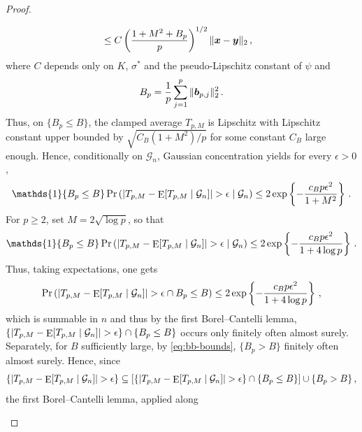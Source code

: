 \documentclass{article}
\makeatletter
\DeclareMathOperator{\expect}{E}
\theoremstyle{definition}
\newcommand{\vnorm}[1]{%
	\ensuremath{%
		\if@display
		\left\| #1 \right\|
		\else
		\| #1 \|
		\fi
	}%
}
\newcommand{\abs}[1]{%
	\ensuremath{%
		\if@display
		\left| #1 \right|
		\else
		\lvert #1 \rvert
		\fi
	}%
}
\newcommand*{\bb}{\boldsymbol}
\makeatother
\begin{document}
\begin{bibunit}
\begin{proof}
\begin{enumerate}[label=(\roman{*})]
$$\begin{aligned}
    &\leq
    C
    \left(
        \frac{1+M^2+B_p}{p}
    \right)^{1/2}
    \vnorm{\bb x-\bb y}_2\,,
\end{aligned}
$$
where $C$ depends only on $K$, $\sigma^*$ and the pseudo-Lipschitz constant of
$\psi$ and 
$$
    B_p 
    = \frac{1}{p} \sum_{j=1}^{p} \vnorm{\bb b_{p,j}}_2^2 \,.
$$
Thus, on $\{B_p\leq B\}$, the clamped average $T_{p,M}$ is Lipschitz with Lipschitz constant upper bounded by $\sqrt{C_B(1 + M^2) / p}$ for some constant $C_B$ large enough. 
Hence, conditionally on $\mathcal G_n$, Gaussian concentration
\citep[Theorem~5.2.2]{vershynin:2018} yields for every
$\epsilon>0$,
\begin{equation}
    \label{eq:prob-bound-lips} 
        \mathds{1}\{B_p\leq B\}
    \Pr
    \left(
        \abs{
            T_{p,M}
            -
            \expect[T_{p,M}\mid\mathcal G_n]
        }
        >
        \epsilon
        \mid
        \mathcal G_n
    \right)
    \leq
    2
    \exp
    \left\{
        -
        \frac{c_Bp\epsilon^2}{1+M^2}
    \right\}\,.
\end{equation}
For $p \geq 2$, set
$
    M =
    2\sqrt{\log p}
$, 
so that
\begin{equation}
    \label{eq:lips-bound} 
   \begin{aligned}
     \mathds{1}\{B_p \leq B \} \Pr \left( \abs{
            T_{p,M}
            -
            \expect[T_{p,M}\mid\mathcal G_n]
        }
        >
        \epsilon
        \mid
        \mathcal G_n\right) 
        \leq 2
    \exp
    \left\{
        -
        \frac{
            c_Bp\epsilon^2
        }{
            1+4\log p
        }
    \right\} \,. 
   \end{aligned}
\end{equation}
Thus, taking expectations, one gets 
$$
    \Pr \left( \abs{T_{p,M} - \expect[T_{p,M} \mid \mathcal G_n]} > \epsilon \cap B_p \leq B \right) \leq  2
    \exp
    \left\{
        -
        \frac{
            c_Bp\epsilon^2
        }{
            1+4\log p
        }
    \right\} \,, 
$$
which is summable in $n$ and thus by the first Borel--Cantelli lemma, $\{\abs{T_{p,M} - \expect[T_{p,M} \mid \mathcal G_n]} > \epsilon \} \cap \{ B_p \leq B\}$ occurs only finitely often almost surely. 
Separately, for $B$ sufficiently large, by \eqref{eq:bb-bounds}, $\{ B_p > B \}$ finitely often almost surely. Hence, since 
$$
    \{\abs{T_{p,M} - \expect[T_{p,M} \mid \mathcal G_n] }> \epsilon  \} \subseteq [\{\abs{T_{p,M} - \expect[T_{p,M} \mid \mathcal G_n]} > \epsilon\} \cap  \{B_p \leq B\} ] \cup \{ B_p > B \}\,, 
$$
the first Borel--Cantelli lemma, applied along

\end{enumerate}
\end{proof}
\end{bibunit}
\end{document}

